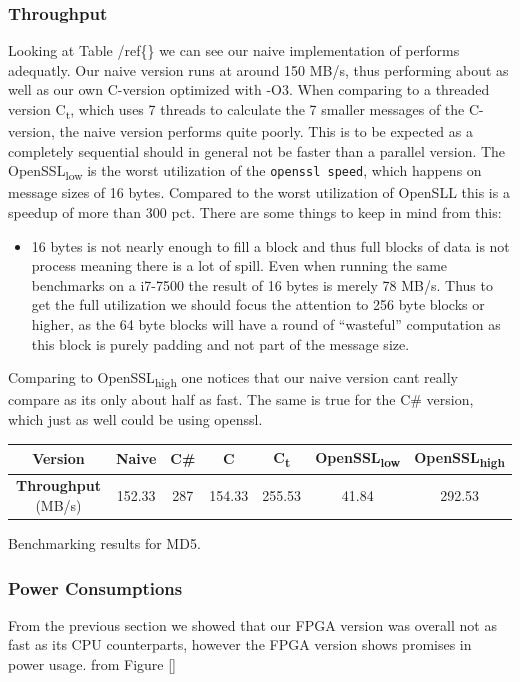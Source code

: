 \documentclass[a4paper]{article}
\begin{document}
\subsubsection{Throughput}
\label{sec:org404e011}
Looking at Table /ref\{\} we can see our naive implementation of performs adequatly. Our naive version runs at around 150 MB/s, thus performing about as well as our own C-version optimized with -O3. When comparing to a threaded version C\textsubscript{t}, which uses 7 threads to calculate the 7 smaller messages of the C-version, the naive version performs quite poorly. This is to be expected as a completely sequential should in general not be faster than a parallel version. The OpenSSL\textsubscript{low} is the worst utilization of the \texttt{openssl speed}, which happens on message sizes of 16 bytes. Compared to the worst utilization of OpenSLL this is a speedup of more than 300 pct. There are some things to keep in mind from this:
\begin{itemize}
\item 16 bytes is not nearly enough to fill a block and thus full blocks of data is not process meaning there is a lot of spill. Even when running the same benchmarks on a i7-7500 the result of 16 bytes is merely 78 MB/s. Thus to get the full utilization we should focus the attention to 256 byte blocks or higher, as the 64 byte blocks will have a round of ``wasteful'' computation as this block is purely padding and not part of the message size.
\end{itemize}
Comparing to OpenSSL\textsubscript{high} one notices that our naive version cant really compare as its only about half as fast. The same is true for the C\# version, which just as well could be using openssl.
\begin{table}[htbp]
\centering
\begin{tabular}{|c|c|c|c|c|c|c|}
\hline
\textbf{Version} & Naive & C\# & C & C\textsubscript{t} & OpenSSL\textsubscript{low} & OpenSSL\textsubscript{high}\\
\hline
\textbf{Throughput} (MB/s) & 152.33 & 287 & 154.33 & 255.53 & 41.84 & 292.53\\
\hline
\end{tabular}
Benchmarking results for MD5.

\end{table}
\subsubsection{Power Consumptions}
\label{sec:org6e483de}
From the previous section we showed that our FPGA version was overall not as fast as its CPU counterparts, however the FPGA version shows promises in power usage. from Figure \ref{}
\end{document}
